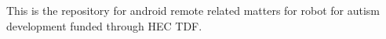 This is the repository for android remote related matters for robot for autism development funded through H\+EC T\+DF. 